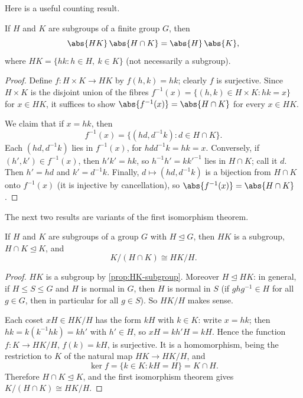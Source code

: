 Here is a useful counting result.

\begin{proposition}\label{prop:product-formula}
	If \(H\) and \(K\) are subgroups of a finite group \(G\), then
	\[
		\abs{HK}\,\abs{H \cap K} = \abs{H}\,\abs{K},
	\]
	where \(HK = \{hk : h \in H,\ k \in K\}\) (not necessarily a subgroup).
\end{proposition}

\begin{proof}
	Define \(f\colon H \times K \to HK\) by \(f(h,k) = hk\); clearly \(f\) is surjective. Since
	\(H \times K\) is the disjoint union of the fibres
	\(f^{-1}(x) = \{(h,k) \in H \times K : hk = x\}\) for \(x \in HK\), it suffices to show
	\(\abs{f^{-1}(x)} = \abs{H \cap K}\) for every \(x \in HK\).

	We claim that if \(x = hk\), then
	\[
		f^{-1}(x) = \{(hd, d^{-1}k) : d \in H \cap K\}.
	\]
	Each \((hd, d^{-1}k)\) lies in \(f^{-1}(x)\), for \(hdd^{-1}k = hk = x\). Conversely, if
	\((h', k') \in f^{-1}(x)\), then \(h'k' = hk\), so \(h^{-1}h' = kk'^{-1}\) lies in
	\(H \cap K\); call it \(d\). Then \(h' = hd\) and \(k' = d^{-1}k\). Finally,
	\(d \mapsto (hd, d^{-1}k)\) is a bijection from \(H \cap K\) onto \(f^{-1}(x)\) (it is
	injective by cancellation), so \(\abs{f^{-1}(x)} = \abs{H \cap K}\).
\end{proof}

The next two results are variants of the first isomorphism theorem.

\begin{theorem}\label{thm:second-iso}
	If \(H\) and \(K\) are subgroups of a group \(G\) with \(H \trianglelefteq G\), then \(HK\)
	is a subgroup, \(H \cap K \trianglelefteq K\), and
	\[
		K/(H \cap K) \cong HK/H.
	\]
\end{theorem}

\begin{proof}
	\(HK\) is a subgroup by \autoref{prop:HK-subgroup}. Moreover \(H \trianglelefteq HK\): in
	general, if \(H \leq S \leq G\) and \(H\) is normal in \(G\), then \(H\) is normal in \(S\)
	(if \(ghg^{-1} \in H\) for all \(g \in G\), then in particular for all \(g \in S\)). So
	\(HK/H\) makes sense.

	Each coset \(xH \in HK/H\) has the form \(kH\) with \(k \in K\): write \(x = hk\); then
	\(hk = k(k^{-1}hk) = kh'\) with \(h' \in H\), so \(xH = kh'H = kH\). Hence the function
	\(f\colon K \to HK/H\), \(f(k) = kH\), is surjective. It is a homomorphism, being the
	restriction to \(K\) of the natural map \(HK \to HK/H\), and
	\[
		\ker f = \{k \in K : kH = H\} = K \cap H.
	\]
	Therefore \(H \cap K \trianglelefteq K\), and the first isomorphism theorem gives
	\(K/(H \cap K) \cong HK/H\).
\end{proof}

